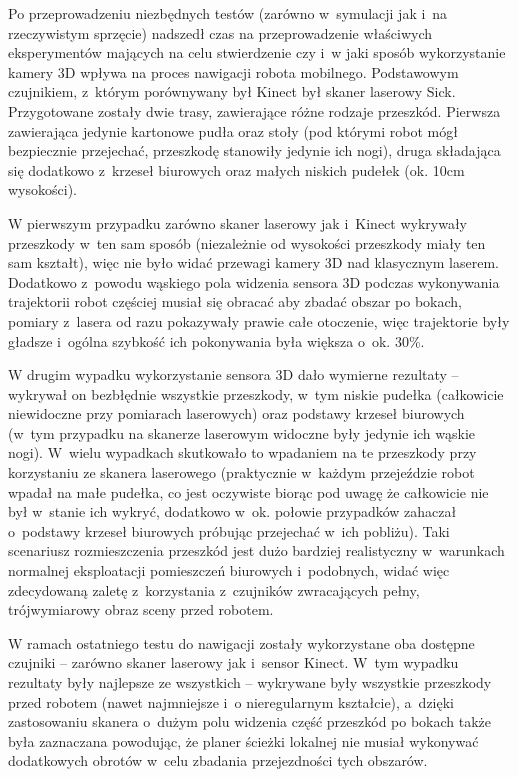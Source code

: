 Po przeprowadzeniu niezbędnych testów (zarówno w~symulacji jak i~na rzeczywistym
sprzęcie) nadszedł czas na przeprowadzenie właściwych eksperymentów mających
na celu stwierdzenie czy i~w jaki sposób wykorzystanie kamery 3D wpływa na
proces nawigacji robota mobilnego. Podstawowym czujnikiem, z~którym porównywany
był Kinect był skaner laserowy Sick. Przygotowane zostały dwie trasy, zawierające
różne rodzaje przeszkód. Pierwsza zawierająca jedynie kartonowe pudła oraz
stoły (pod którymi robot mógł bezpiecznie przejechać, przeszkodę stanowiły
jedynie ich nogi), druga składająca się dodatkowo z~krzeseł biurowych oraz
małych niskich pudełek (ok. 10cm wysokości).

W pierwszym przypadku zarówno skaner laserowy jak i~Kinect wykrywały przeszkody
w~ten sam sposób (niezależnie od wysokości przeszkody miały ten sam kształt),
więc nie było widać przewagi kamery 3D nad klasycznym laserem. Dodatkowo z~powodu
wąskiego pola widzenia sensora 3D podczas wykonywania trajektorii robot częściej
musiał się obracać aby zbadać obszar po bokach, pomiary z~lasera od razu
pokazywały prawie całe otoczenie, więc trajektorie były gładsze i~ogólna
szybkość ich pokonywania była większa o~ok. 30\%.

W drugim wypadku wykorzystanie sensora 3D dało wymierne rezultaty -- wykrywał
on bezbłędnie wszystkie przeszkody, w~tym niskie pudełka (całkowicie niewidoczne
przy pomiarach laserowych) oraz podstawy krzeseł biurowych (w~tym przypadku
na skanerze laserowym widoczne były jedynie ich wąskie nogi). W~wielu wypadkach
skutkowało to wpadaniem na te przeszkody przy korzystaniu ze skanera laserowego
(praktycznie w~każdym przejeździe robot wpadał na małe pudełka, co jest
oczywiste biorąc pod uwagę że całkowicie nie był w~stanie ich wykryć, dodatkowo
w~ok. połowie przypadków zahaczał o~podstawy krzeseł biurowych próbując
przejechać w~ich pobliżu). Taki scenariusz rozmieszczenia przeszkód jest
dużo bardziej realistyczny w~warunkach normalnej eksploatacji pomieszczeń
biurowych i~podobnych, widać więc zdecydowaną zaletę z~korzystania z~czujników
zwracających pełny, trójwymiarowy obraz sceny przed robotem.

W ramach ostatniego testu do nawigacji zostały wykorzystane oba dostępne czujniki
-- zarówno skaner laserowy jak i~sensor Kinect. W~tym wypadku rezultaty były
najlepsze ze wszystkich -- wykrywane były wszystkie przeszkody przed robotem
(nawet najmniejsze i~o nieregularnym kształcie), a~dzięki zastosowaniu skanera
o~dużym polu widzenia część przeszkód po bokach także była zaznaczana powodując,
że planer ścieżki lokalnej nie musiał wykonywać dodatkowych obrotów w~celu
zbadania przejezdności tych obszarów.
